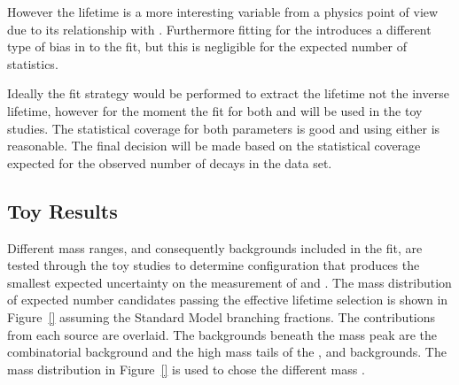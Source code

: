 { However the lifetime is a more interesting variable from a physics point of view due to its relationship with \ADG. Furthermore fitting for the \Gmumu introduces a different type of bias in to the fit, but this is negligible for the expected number of statistics. 



Ideally the fit strategy would be performed to extract the lifetime not the inverse lifetime, however for the moment the \ml fit for both \tmumu and \Gmumu will be used in the toy studies. The statistical coverage for both parameters is good and using either is reasonable. The final decision will be made based on the statistical coverage expected for the observed number of decays in the data set. 


   
\subsection{Toy Results}
\label{sec:toyresults}

Different mass ranges, and consequently backgrounds included in the \ml fit, are tested through the toy studies to determine configuration that produces the smallest expected uncertainty on the measurement of \tmumu and \Gmumu.
The mass distribution of expected number \bsmumu candidates passing the effective lifetime selection is shown in Figure~\ref{} assuming the Standard Model \bmumu branching fractions. The contributions from each source are overlaid. The backgrounds beneath the \bs mass peak are the combinatorial background and the high mass tails of the \bhh, \bdmum and \lambdab backgrounds. The mass distribution in Figure~\ref{} is used to chose the different mass \pdfs.

}

